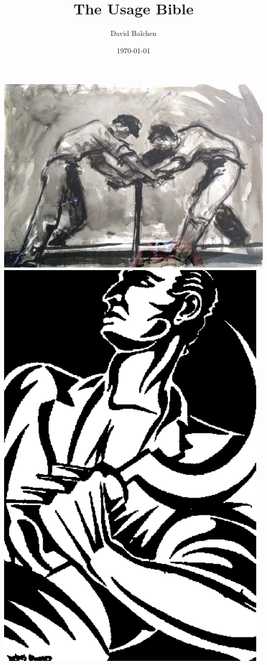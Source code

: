 \documentclass[12pt,twoside]{article}
\author{David Balchen}
\date{\today}
\title{The Usage Bible}
\begin{document}
\maketitle
{}
\includegraphics[width=16cm]{Pictures/Andrejevi1.jpg}
\newpage 
\includegraphics[width=13cm]{Pictures/postal5.png}
\end{document}
